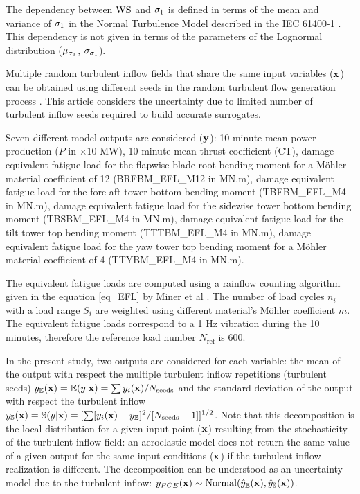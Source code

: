 \documentclass[preprint,12pt]{elsarticle}
\begin{document}
The dependency between $\text{WS}$ and $\sigma_{1}$ is defined in terms of the mean and variance of $\sigma_{1}$ in the Normal Turbulence Model described in the IEC 61400-1 \cite{international2005iec}. This dependency is not given in terms of the parameters of the Lognormal distribution ($\mu_{\sigma_{1}}$, $\sigma_{\sigma_{1}}$).


Multiple random turbulent inflow fields that share the same input variables ($\mathbf{x}$) can be obtained using different seeds in the random turbulent flow generation process \cite{Mann1998}. This article considers the uncertainty due to limited number of turbulent inflow seeds required to build accurate surrogates.

Seven different model outputs are considered ($\mathbf{y}$): 10 minute mean power production ($P$ in $\times 10$ MW), 10 minute mean thrust coefficient (CT), damage equivalent fatigue load for the flapwise blade root bending moment for a M{\"o}hler material coefficient of 12 (BRFBM\_EFL\_M12 in MN.m), damage equivalent fatigue load for the fore-aft tower bottom bending moment (TBFBM\_EFL\_M4 in MN.m), damage equivalent fatigue load for the sidewise tower bottom bending moment (TBSBM\_EFL\_M4 in MN.m), damage equivalent fatigue load for the tilt tower top bending moment (TTTBM\_EFL\_M4 in MN.m), damage equivalent fatigue load for the yaw tower top bending moment for a M{\"o}hler material coefficient of 4 (TTYBM\_EFL\_M4 in MN.m).

The equivalent fatigue loads are computed using a rainflow counting algorithm given in the equation \ref{eq_EFL} by Miner et al \cite{miner1945cumulative}. The number of load cycles $n_i$ with a load range $S_i$ are weighted using different material's M{\"o}hler coefficient $m$. The equivalent fatigue loads correspond to a 1 Hz vibration during the 10 minutes, therefore the reference load number $N_{\text{ref}}$ is 600.


In the present study, two outputs are considered for each variable: the mean of the output with respect the multiple turbulent inflow repetitions (turbulent seeds) $y_{\mathbb{E}}(\mathbf{x})=\mathbb{E}(y|\mathbf{x})=\sum y_i(\mathbf{x})/N_{\text{seeds}}$ and the standard deviation of the output with respect the turbulent inflow $y_{\mathbb{S}}(\mathbf{x})=\mathbb{S}(y|\mathbf{x})=[\sum [y_i(\mathbf{x}) - y_{\mathbb{E}}]^2/[N_{\text{seeds}}-1]]^{1/2}$. Note that this decomposition is the local distribution for a given input point ($\mathbf{x}$) resulting from the stochasticity of the turbulent inflow field: an aeroelastic model does not return the same value of a given output for the same input conditions ($\mathbf{x}$) if the turbulent inflow realization is different. The decomposition can be understood as an uncertainty model due to the turbulent inflow: $y_{PCE}(\mathbf{x}) \sim \text{Normal} (\hat{y}_{\mathbb{E}}(\mathbf{x}),\hat{y}_{\mathbb{S}}(\mathbf{x}))$.
\end{document}

